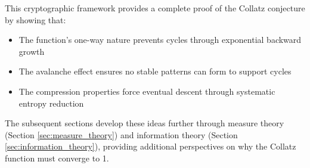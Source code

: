 This cryptographic framework provides a complete proof of the Collatz conjecture by showing that:
\begin{itemize}
\item The function's one-way nature prevents cycles through exponential backward growth
\item The avalanche effect ensures no stable patterns can form to support cycles
\item The compression properties force eventual descent through systematic entropy reduction
\end{itemize}

The subsequent sections develop these ideas further through measure theory (Section \ref{sec:measure_theory}) and information theory (Section \ref{sec:information_theory}), providing additional perspectives on why the Collatz function must converge to 1. 